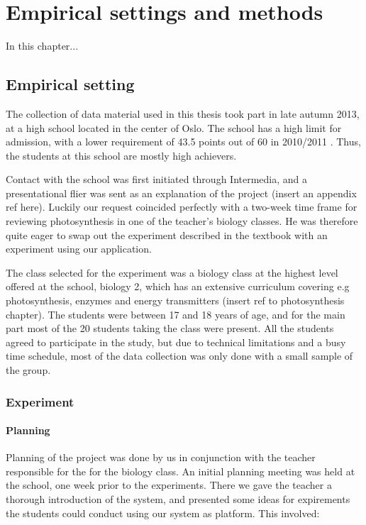 \chapter{Empirical settings and methods}
In this chapter...

\section{Empirical setting}
The collection of data material used in this thesis took part in late autumn 2013, at a high school located in the center of Oslo. The school has a high limit for admission, with a lower requirement of 43.5 points out of 60 in 2010/2011 \citep{utdanningsetaten}. Thus, the students at this school are mostly high achievers. 

Contact with the school was first initiated through Intermedia, and a presentational flier was sent as an explanation of the project (insert an appendix ref here). Luckily our request coincided perfectly with a two-week time frame for reviewing photosynthesis in one of the teacher's biology classes. He was therefore quite eager to swap out the experiment described in the textbook with an experiment using our application. 

The class selected for the experiment was a biology class at the highest level offered at the school, biology 2, which has an extensive curriculum covering e.g photosynthesis, enzymes and energy transmitters (insert ref to photosynthesis chapter). The students were between 17 and 18 years of age, and for the main part most of the 20 students taking the class were present. All the students agreed to participate in the study, but due to technical limitations and a busy time schedule, most of the data collection was only done with a small sample of the group. 

\subsection{Experiment}
\subsubsection{Planning}
Planning of the project was done by us in conjunction with the teacher responsible for the for the biology class. An initial planning meeting was held at the school, one week prior to the experiments. There we gave the teacher a thorough introduction of the system, and presented some ideas for expirements the students could conduct using our system as platform. This involved:

